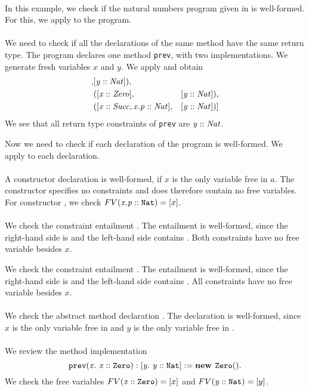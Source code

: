 \begin{example}\quad\\
In this example, we check if the natural numbers program
given in  is well-formed.
For this, we apply  to the program.\\
\\
We need to check if all the declarations
of the same method have the same return type.
The program declares one method \texttt{prev},
with two implementations.
We generate fresh variables $x$ and $y$.
We apply 
and obtain
\begin{align*}
[
  &([\instOf{x}{Nat}], &[\instOf{y}{Nat}]),\\
  &([\instOf{x}{Zero}], &[\instOf{y}{Nat}]),\\
  &([\instOf{x}{Succ}, \instOf{x.p}{Nat}], &[\instOf{y}{Nat}])
]
\end{align*}
We see that all return type constraints of \texttt{prev} are $\mathit{y} :: \mathit{Nat}$.

Now we need to check if each declaration of the program is well-formed.
We apply  to each declaration.\\
\\
A constructor declaration  is well-formed,
if $x$ is the only variable free in $a$.
The constructor 
specifies no constraints and does therefore contain no free variables.
For constructor ,
we check $FV(\mathit{x.p} :: \mathit{\texttt{Nat}}) = [x]$.\\
\\
We check the constraint entailment .
The entailment is well-formed, since the right-hand side is 
and the left-hand side contains .
Both constraints have no free variable besides $x$.

We check the constraint entailment .
The entailment is well-formed, since the right-hand side is 
and the left-hand side contains .
All constraints have no free variable besides $x$.\\
\\
We check the abstract method declaration
.
The declaration is well-formed,
since $x$ is the only variable free in 
and $y$ is the only variable free in .\\
\\
We review the method implementation
\[
  \mathit{\texttt{prev}}(\mathit{x}.\ \mathit{\mathit{x} :: \mathit{\texttt{Zero}}}): \mathit{[y.\ \mathit{\mathit{y} :: \mathit{\texttt{Nat}}}]} := \mathit{\textbf{new } \mathit{\texttt{Zero}}()}.
\]
We check the free variables
$FV(\mathit{x} :: \mathit{\texttt{Zero}}) = [x]$
and
$FV(\mathit{y} :: \mathit{\texttt{Nat}}) = [y]$.


\end{example}

